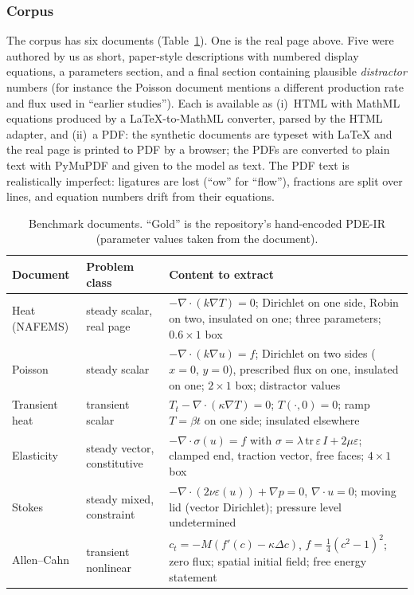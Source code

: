 \subsubsection{Corpus}
The corpus has six documents (Table~\ref{tab:corpus}). One is the real page above. Five were authored by us as short, paper-style descriptions with numbered display equations, a parameters section, and a final section containing plausible \emph{distractor} numbers (for instance the Poisson document mentions a different production rate and flux used in ``earlier studies''). Each is available as (i)~HTML with MathML equations produced by a \LaTeX-to-MathML converter, parsed by the HTML adapter, and (ii)~a PDF: the synthetic documents are typeset with \LaTeX{} and the real page is printed to PDF by a browser; the PDFs are converted to plain text with PyMuPDF \citep{pymupdf} and given to the model as text. The PDF text is realistically imperfect: ligatures are lost (``ow'' for ``flow''), fractions are split over lines, and equation numbers drift from their equations.

\begin{table}[t]
\centering\small
\caption{Benchmark documents. ``Gold'' is the repository's hand-encoded PDE-IR (parameter values taken from the document).}
\label{tab:corpus}
\begin{tabularx}{\textwidth}{@{}p{2.4cm}p{3.3cm}X@{}}
\toprule
Document & Problem class & Content to extract\\ \midrule
Heat (NAFEMS) & steady scalar, real page & $-\nabla\cdot(k\nabla T)=0$; Dirichlet on one side, Robin on two, insulated on one; three parameters; $0.6\times1$ box\\
Poisson & steady scalar & $-\nabla\cdot(k\nabla u)=f$; Dirichlet on two sides ($x=0$, $y=0$), prescribed flux on one, insulated on one; $2\times1$ box; distractor values\\
Transient heat & transient scalar & $T_t-\nabla\cdot(\kappa\nabla T)=0$; $T(\cdot,0)=0$; ramp $T=\beta t$ on one side; insulated elsewhere\\
Elasticity & steady vector, constitutive & $-\nabla\cdot\sigma(u)=f$ with $\sigma=\lambda\,\mathrm{tr}\,\varepsilon\,I+2\mu\varepsilon$; clamped end, traction vector, free faces; $4\times1$ box\\
Stokes & steady mixed, constraint & $-\nabla\cdot(2\nu\varepsilon(u))+\nabla p=0$, $\nabla\cdot u=0$; moving lid (vector Dirichlet); pressure level undetermined\\
Allen--Cahn & transient nonlinear & $c_t=-M(f'(c)-\kappa\Delta c)$, $f=\tfrac14(c^2-1)^2$; zero flux; spatial initial field; free energy statement\\
\bottomrule\end{tabularx}
\end{table}

